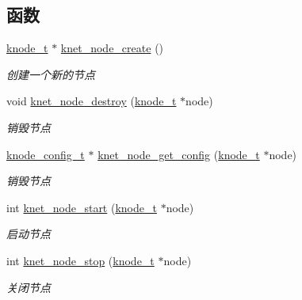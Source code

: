\subsection*{函数}
\begin{DoxyCompactItemize}
\item 
\hyperlink{a00066_a5e720b27efbc9ad744240f5f4233763a_a5e720b27efbc9ad744240f5f4233763a}{knode\+\_\+t} $\ast$ \hyperlink{a00135_ga178be792592fd4557bfe931b5845b66a_ga178be792592fd4557bfe931b5845b66a}{knet\+\_\+node\+\_\+create} ()
\begin{DoxyCompactList}\small\item\em 创建一个新的节点 \end{DoxyCompactList}\item 
void \hyperlink{a00135_ga7b577b6a8883b8c69cfc2d9eadb98d03_ga7b577b6a8883b8c69cfc2d9eadb98d03}{knet\+\_\+node\+\_\+destroy} (\hyperlink{a00066_a5e720b27efbc9ad744240f5f4233763a_a5e720b27efbc9ad744240f5f4233763a}{knode\+\_\+t} $\ast$node)
\begin{DoxyCompactList}\small\item\em 销毁节点 \end{DoxyCompactList}\item 
\hyperlink{a00066_af1cfaee0eb1c76ebf06076b95cc47ee1_af1cfaee0eb1c76ebf06076b95cc47ee1}{knode\+\_\+config\+\_\+t} $\ast$ \hyperlink{a00135_ga2ceebf25bbc4306817d7ef45ca1c44b8_ga2ceebf25bbc4306817d7ef45ca1c44b8}{knet\+\_\+node\+\_\+get\+\_\+config} (\hyperlink{a00066_a5e720b27efbc9ad744240f5f4233763a_a5e720b27efbc9ad744240f5f4233763a}{knode\+\_\+t} $\ast$node)
\begin{DoxyCompactList}\small\item\em 销毁节点 \end{DoxyCompactList}\item 
int \hyperlink{a00135_gac3884a7a111f4fff8aad997d41e92712_gac3884a7a111f4fff8aad997d41e92712}{knet\+\_\+node\+\_\+start} (\hyperlink{a00066_a5e720b27efbc9ad744240f5f4233763a_a5e720b27efbc9ad744240f5f4233763a}{knode\+\_\+t} $\ast$node)
\begin{DoxyCompactList}\small\item\em 启动节点 \end{DoxyCompactList}\item 
int \hyperlink{a00135_ga8d63fa0942bef4d3db588bb72c57df91_ga8d63fa0942bef4d3db588bb72c57df91}{knet\+\_\+node\+\_\+stop} (\hyperlink{a00066_a5e720b27efbc9ad744240f5f4233763a_a5e720b27efbc9ad744240f5f4233763a}{knode\+\_\+t} $\ast$node)
\begin{DoxyCompactList}\small\item\em 关闭节点 \end{DoxyCompactList}\item 

\end{DoxyCompactItemize}
